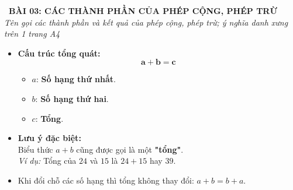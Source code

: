 \documentclass[11pt,a4paper]{article}
\begin{document}
\begin{tcolorbox}[
  enhanced,
  colback=violet!8!white,
  colframe=violet!70!black,
  arc=3mm, boxrule=1.2pt,
  left=3mm, right=3mm, top=2mm, bottom=2mm,
  halign=center
]
  {\LARGE\bfseries\color{violet!90!black}\faBookmark\ BÀI 03: CÁC THÀNH PHẦN CỦA PHÉP CỘNG, PHÉP TRỪ}\\[1mm]
  {\itshape\footnotesize\color{black!75} Tên gọi các thành phần và kết quả của phép cộng, phép trừ; ý nghĩa danh xưng trên 1 trang A4}
\end{tcolorbox}

\vspace{-2mm}

\noindent
\begin{minipage}[t]{0.49\textwidth}\vspace{0pt}
\begin{tcolorbox}[
  enhanced,
  colback=violet!4!white,
  colframe=violet!75!black,
  arc=2mm, boxrule=0.8pt,
  left=2mm, right=2mm, top=1.8mm, bottom=1.8mm,
  title={\footnotesize\bfseries\color{white}\faKey\ 1. Thành phần phép cộng}
]
{\footnotesize
\begin{itemize}\setlength{\itemsep}{1pt}\setlength{\leftskip}{-2.5mm}
  \item \textbf{Cấu trúc tổng quát:}
  $$\mathbf{a + b = c}$$
  \begin{itemize}\setlength{\itemsep}{0.5pt}\setlength{\leftskip}{-2.5mm}
    \item $a$: \textbf{Số hạng thứ nhất}.
    \item $b$: \textbf{Số hạng thứ hai}.
    \item $c$: \textbf{Tổng}.
  \end{itemize}
  \item \textbf{Lưu ý đặc biệt:}\\
  Biểu thức $a + b$ cũng được gọi là một \textbf{"tổng"}.\\
  \textit{Ví dụ:} Tổng của $24$ và $15$ là $24 + 15$ hay $39$.
  \item Khi đổi chỗ các số hạng thì tổng không thay đổi: $a + b = b + a$.
\end{itemize}
}
\end{tcolorbox}
\end{minipage}
\hfill
\end{document}
